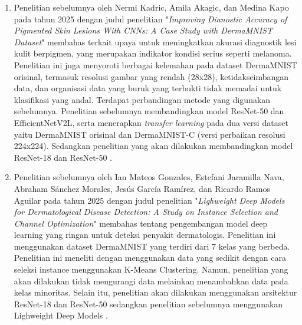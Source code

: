 \begin{enumerate}[noitemsep]
	\item Penelitian sebelumnya oleh Nermi Kadric, Amila Akagic, dan 
	Medina Kapo pada tahun 2025 dengan judul penelitian "\textit{Improving 
	Dianostic Accuracy of Pigmented Skin Lesions With CNNs: A Case Study 
	with DermaMNIST Dataset}" membahas terkait upaya untuk meningkatkan 
	akurasi diagnostik lesi kulit berpigmen, yang merupakan indikator 
	kondisi serius seperti melanoma. Penelitian ini juga menyoroti 
	berbagai kelemahan pada dataset DermaMNIST orisinal, termasuk resolusi 
	gambar yang rendah (28x28), ketidakseimbangan data, dan organisasi 
	data yang buruk yang terbukti tidak memadai untuk klasifikasi yang 
	andal. Terdapat perbandingan metode yang digunakan sebelumnya. 
	Penelitian sebelumnya membandingkan model ResNet-50 dan 
	EfficientNetV2L, serta menerapkan \textit{transfer learning} pada dua 
	versi dataset yaitu DermaMNIST orisinal dan DermaMNIST-C (versi 
	perbaikan resolusi 224x224). Sedangkan penelitian yang akan dilakukan 
	membandingkan model ResNet-18 dan ResNet-50 \cite{kadric2025improvingdiagnosticaccuracypigmented}.

	\item Penelitian sebelumnya oleh Ian Mateos Gonzales, Estefani Jaramilla
	Nava, Abraham Sánchez Morales, Jesús García Ramírez, dan Ricardo Ramos
	Aguilar pada tahun 2025 dengan judul penelitian "\textit{Lighweight 
	Deep Models for Dermatological Disease Detection: A Study on Instance 
	Selection and Channel Optimization}" membahas tentang pengembangan 
	model deep learning yang ringan untuk deteksi penyakit dermatologis. 
	Penelitian ini menggunakan dataset DermaMNIST yang terdiri dari 7 
	kelas yang berbeda. Penelitian ini meneliti dengan menggunakan data 
	yang sedikit dengan cara seleksi instance menggunakan K-Means 
	Clustering. Namun, penelitian yang akan dilakukan tidak mengurangi 
	data melainkan menambahkan data pada kelas minoritas. Selain itu, 
	penelitian akan dilakukan menggunakan arsitektur ResNet-18 dan 
	ResNet-50 sedangkan penelitian sebelumnya menggunakan Lighweight 
	Deep Models \cite{gonzalez2025lightweightdeepmodelsdermatological}.


\end{enumerate}
